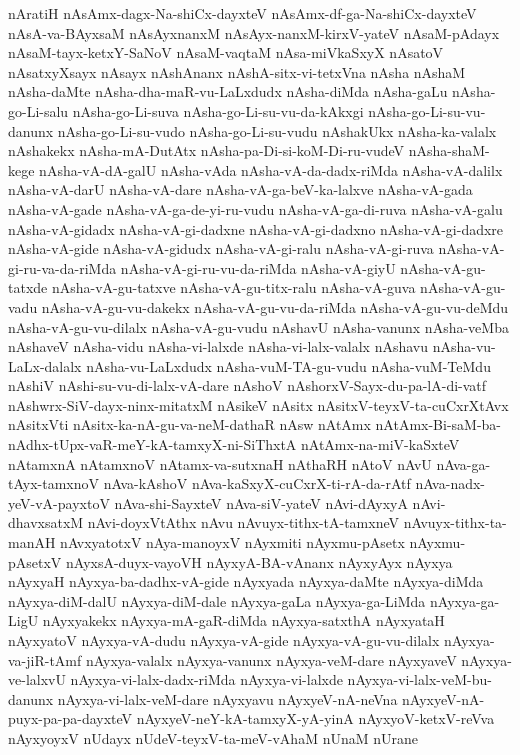 {nAratiH
nAsAmx-dagx-Na-shiCx-dayxteV
nAsAmx-df-ga-Na-shiCx-dayxteV
nAsA-va-BAyxsaM
nAsAyxnanxM
nAsAyx-nanxM-kirxV-yateV
nAsaM-pAdayx
nAsaM-tayx-ketxY-SaNoV
nAsaM-vaqtaM
nAsa-miVkaSxyX
nAsatoV
nAsatxyXsayx
nAsayx
nAshAnanx
nAshA-sitx-vi-tetxVna
nAsha
nAshaM
nAsha-daMte
nAsha-dha-maR-vu-LaLxdudx
nAsha-diMda
nAsha-gaLu
nAsha-go-Li-salu
nAsha-go-Li-suva
nAsha-go-Li-su-vu-da-kAkxgi
nAsha-go-Li-su-vu-danunx
nAsha-go-Li-su-vudo
nAsha-go-Li-su-vudu
nAshakUkx
nAsha-ka-valalx
nAshakekx
nAsha-mA-DutAtx
nAsha-pa-Di-si-koM-Di-ru-vudeV
nAsha-shaM-kege
nAsha-vA-dA-galU
nAsha-vAda
nAsha-vA-da-dadx-riMda
nAsha-vA-dalilx
nAsha-vA-darU
nAsha-vA-dare
nAsha-vA-ga-beV-ka-lalxve
nAsha-vA-gada
nAsha-vA-gade
nAsha-vA-ga-de-yi-ru-vudu
nAsha-vA-ga-di-ruva
nAsha-vA-galu
nAsha-vA-gidadx
nAsha-vA-gi-dadxne
nAsha-vA-gi-dadxno
nAsha-vA-gi-dadxre
nAsha-vA-gide
nAsha-vA-gidudx
nAsha-vA-gi-ralu
nAsha-vA-gi-ruva
nAsha-vA-gi-ru-va-da-riMda
nAsha-vA-gi-ru-vu-da-riMda
nAsha-vA-giyU
nAsha-vA-gu-tatxde
nAsha-vA-gu-tatxve
nAsha-vA-gu-titx-ralu
nAsha-vA-guva
nAsha-vA-gu-vadu
nAsha-vA-gu-vu-dakekx
nAsha-vA-gu-vu-da-riMda
nAsha-vA-gu-vu-deMdu
nAsha-vA-gu-vu-dilalx
nAsha-vA-gu-vudu
nAshavU
nAsha-vanunx
nAsha-veMba
nAshaveV
nAsha-vidu
nAsha-vi-lalxde
nAsha-vi-lalx-valalx
nAshavu
nAsha-vu-LaLx-dalalx
nAsha-vu-LaLxdudx
nAsha-vuM-TA-gu-vudu
nAsha-vuM-TeMdu
nAshiV
nAshi-su-vu-di-lalx-vA-dare
nAshoV
nAshorxV-Sayx-du-pa-lA-di-vatf
nAshwrx-SiV-dayx-ninx-mitatxM
nAsikeV
nAsitx
nAsitxV-teyxV-ta-cuCxrXtAvx
nAsitxVti
nAsitx-ka-nA-gu-va-neM-dathaR
nAsw
nAtAmx
nAtAmx-Bi-saM-ba-nAdhx-tUpx-vaR-meY-kA-tamxyX-ni-SiThxtA
nAtAmx-na-miV-kaSxteV
nAtamxnA
nAtamxnoV
nAtamx-va-sutxnaH
nAthaRH
nAtoV
nAvU
nAva-ga-tAyx-tamxnoV
nAva-kAshoV
nAva-kaSxyX-cuCxrX-ti-rA-da-rAtf
nAva-nadx-yeV-vA-payxtoV
nAva-shi-SayxteV
nAva-siV-yateV
nAvi-dAyxyA
nAvi-dhavxsatxM
nAvi-doyxVtAthx
nAvu
nAvuyx-tithx-tA-tamxneV
nAvuyx-tithx-ta-manAH
nAvxyatotxV
nAya-manoyxV
nAyxmiti
nAyxmu-pAsetx
nAyxmu-pAsetxV
nAyxsA-duyx-vayoVH
nAyxyA-BA-vAnanx
nAyxyAyx
nAyxya
nAyxyaH
nAyxya-ba-dadhx-vA-gide
nAyxyada
nAyxya-daMte
nAyxya-diMda
nAyxya-diM-dalU
nAyxya-diM-dale
nAyxya-gaLa
nAyxya-ga-LiMda
nAyxya-ga-LigU
nAyxyakekx
nAyxya-mA-gaR-diMda
nAyxya-satxthA
nAyxyataH
nAyxyatoV
nAyxya-vA-dudu
nAyxya-vA-gide
nAyxya-vA-gu-vu-dilalx
nAyxya-va-jiR-tAmf
nAyxya-valalx
nAyxya-vanunx
nAyxya-veM-dare
nAyxyaveV
nAyxya-ve-lalxvU
nAyxya-vi-lalx-dadx-riMda
nAyxya-vi-lalxde
nAyxya-vi-lalx-veM-bu-danunx
nAyxya-vi-lalx-veM-dare
nAyxyavu
nAyxyeV-nA-neVna
nAyxyeV-nA-puyx-pa-pa-dayxteV
nAyxyeV-neY-kA-tamxyX-yA-yinA
nAyxyoV-ketxV-reVva
nAyxyoyxV
nUdayx
nUdeV-teyxV-ta-meV-vAhaM
nUnaM
nUrane
}
